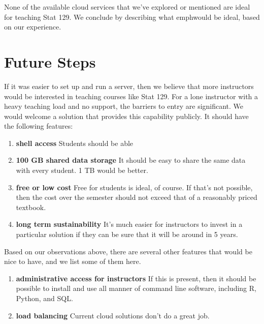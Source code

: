 \documentclass[12pt]{article}
\begin{document}
None of the available cloud services that we've explored or mentioned are ideal for teaching Stat 129.
We conclude by describing what emph{would} be ideal, based on our experience.

\section{Future Steps}

If it was easier to set up and run a server, then we believe that more instructors would be interested in teaching courses like Stat 129.
For a lone instructor with a heavy teaching load and no support, the barriers to entry are significant.
We would welcome a solution that provides this capability publicly.
It should have the following features:
\begin{enumerate}
\item \textbf{shell access} Students should be able 
\item \textbf{100 GB shared data storage} It should be easy to share the same data with every student.
    1 TB would be better.
\item \textbf{free or low cost} Free for students is ideal, of course.
    If that's not possible, then the cost over the semester should not exceed that of a reasonably priced textbook.
\item \textbf{long term sustainability} It's much easier for instructors to invest in a particular solution if they can be sure that it will be around in 5 years.
\end{enumerate}
Based on our observations above, there are several other features that would be nice to have, and we list some of them here.

\begin{enumerate}
\item \textbf{administrative access for instructors} If this is present, then it should be possible to install and use all manner of command line software, including R, Python, and SQL.
\item \textbf{load balancing} Current cloud solutions don't do a great job.
\end{enumerate}



\end{document}
